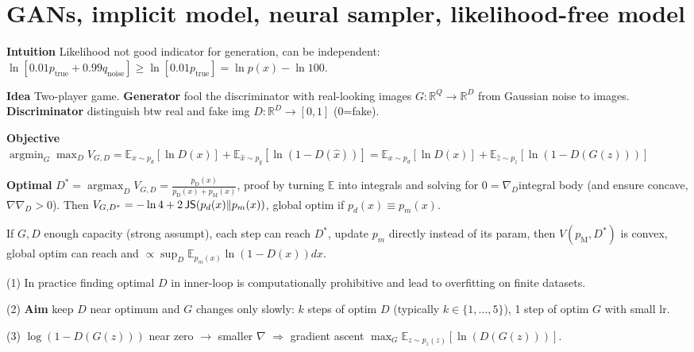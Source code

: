 \section{GANs, implicit model, neural sampler, likelihood-free model}

\textbf{Intuition} Likelihood not good indicator for generation, can be independent: \(\ln [0.01 p_{\text{true}}+0.99 q_{\text{noise}}] \geq \ln [0.01 p_{\text{true}}]=\ln p({x})-\ln 100\).

\textbf{Idea} Two-player game. \textbf{Generator} fool the discriminator with real-looking images \(G: \mathbb{R}^{Q} \to \mathbb{R}^{D}\) from Gaussian noise to images. \textbf{Discriminator} distinguish btw real and fake img \(D: \mathbb{R}^{D} \to [0,1]\) (0=fake\!)\!.

\textbf{Objective} \( \operatorname{argmin}_G \max_D {V}_{{G}, {D}}=\mathbb{E}_{x \sim p_d} [\ln D({x})] + \mathbb{E}_{\hat{x} \sim p_g} [\ln (1-D(\hat{{x}}))] = \mathbb{E}_{x \sim p_d} [\ln D({x})] + \mathbb{E}_{\hat{z} \sim p_z} [\ln (1-D(G(z)))]\)

\textbf{Optimal} \(D^{*} = \operatorname{argmax}_D {V}_{{G}, {D}} = \frac{p_{\text{D}}({x})}{p_{\text {D}}({x})+p_{\text {M}}({x})}\), proof by turning $\mathbb{E}$ into integrals and solving for $0=\nabla_D$integral body (and ensure concave, $\nabla\nabla_D > 0$). Then \(V_{G, D^{*}} =  -\ln 4+2 \operatorname{\mathsf{JS}} (p_{d}({x}) \| p_{m}({x}))\), global optim if \(p_{d}({x})\equiv p_{m}({x})\).

If \(G,D\) enough capacity (strong assumpt), each step can reach \(D^*\),  update \(p_{m}\) directly instead of its param, then \(V(p_{\text{M}}, D^{*})\) is convex, global optim can reach and \( \propto \sup _{D} \mathbb{E}_{p_{m}({x})} \ln (1-D({x})) d {x}\).

(1) In practice finding optimal \(D\) in inner-loop is computationally prohibitive and lead to overfitting on finite datasets.

(2) \textbf{Aim} keep \(D\) near optimum and \(G\) changes only slowly: \(k\) steps of optim \(D\) (typically \(k \in\{1, \ldots, 5\}\)), 1 step of optim \(G\) with small lr. 

(3) \(\log (1-D(G(z)))\) near zero \(\to\) smaller \(\nabla\) \(\Rightarrow\) gradient ascent \(\max _{G} \mathbb{E}_{z \sim p_{z}(z)}[\ln (D(G(z)))]\).


